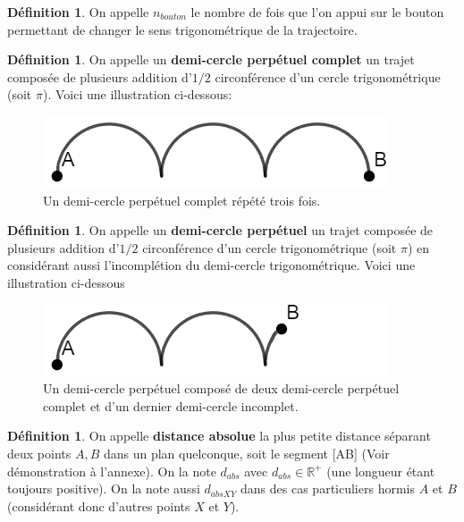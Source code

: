 \documentclass{amsart}
\theoremstyle{definition}
\newtheorem{definition}[theorem]{Définition}
\theoremstyle{remark}
\numberwithin{equation}{section}
\begin{document}
\begin{definition}
  On appelle $n_{bouton}$ le nombre de fois que l'on appui sur le bouton permettant de changer le sens trigonométrique de la trajectoire.
\end{definition}

\begin{definition}
  On appelle un \textbf{demi-cercle perpétuel complet} un trajet composée de plusieurs addition d'$1/2$ circonférence d'un cercle trigonométrique (soit $\pi$). Voici une illustration ci-dessous:

  \begin{figure}[H]
    \centering
    \includegraphics[scale=0.5]{images/demicircle.png}
    \caption{Un demi-cercle perpétuel complet répété trois fois.}
  \end{figure}
\end{definition}

\begin{definition}
  On appelle un \textbf{demi-cercle perpétuel} un trajet composée de plusieurs addition d'$1/2$ circonférence d'un cercle trigonométrique (soit $\pi$) en considérant aussi l'incomplétion du demi-cercle trigonométrique. Voici une illustration ci-dessous

  \begin{figure}[H]
    \centering
    \includegraphics[scale=0.5]{images/incomplete_demi_circle.png}
    \caption{Un demi-cercle perpétuel composé de deux demi-cercle perpétuel complet et d'un dernier demi-cercle incomplet.}
  \end{figure}
\end{definition}

\begin{definition}
  On appelle \textbf{distance absolue} la plus petite distance séparant deux points $A,B$ dans un plan quelconque, soit le segment [AB] (Voir démonstration à l'annexe). On la note $d_{abs}$ avec $d_{abs}\in\mathbb{R^+}$ (une longueur étant toujours positive). On la note
  aussi $d_{abs XY}$ dans des cas particuliers hormis $A$ et $B$ (considérant donc d'autres points $X$ et $Y$).
\end{definition}
\end{document}
